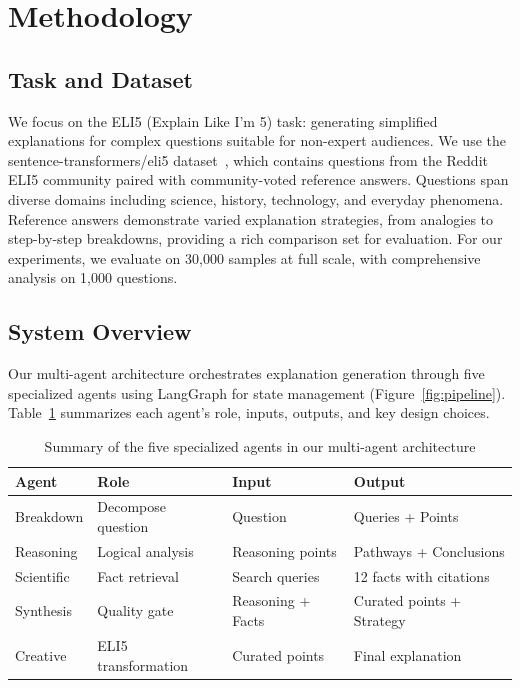 \section{Methodology}
\label{sec:methodology}

\subsection{Task and Dataset}

We focus on the ELI5 (Explain Like I'm 5) task: generating simplified explanations for complex questions suitable for non-expert audiences. We use the sentence-transformers/eli5 dataset~\cite{eli5dataset}, which contains questions from the Reddit ELI5 community paired with community-voted reference answers. Questions span diverse domains including science, history, technology, and everyday phenomena. Reference answers demonstrate varied explanation strategies, from analogies to step-by-step breakdowns, providing a rich comparison set for evaluation. For our experiments, we evaluate on 30,000 samples at full scale, with comprehensive analysis on 1,000 questions.

\subsection{System Overview}

Our multi-agent architecture orchestrates explanation generation through five specialized agents using LangGraph for state management (Figure~\ref{fig:pipeline}). Table~\ref{tab:agents} summarizes each agent's role, inputs, outputs, and key design choices.

\begin{table}[t]
\centering
\caption{Summary of the five specialized agents in our multi-agent architecture}
\label{tab:agents}
\begin{tabular}{llll}
\toprule
\textbf{Agent} & \textbf{Role} & \textbf{Input} & \textbf{Output} \\
\midrule
Breakdown & Decompose question & Question & Queries + Points \\
Reasoning & Logical analysis & Reasoning points & Pathways + Conclusions \\
Scientific & Fact retrieval & Search queries & 12 facts with citations \\
Synthesis & Quality gate & Reasoning + Facts & Curated points + Strategy \\
Creative & ELI5 transformation & Curated points & Final explanation \\
\bottomrule
\end{tabular}
\end{table}

